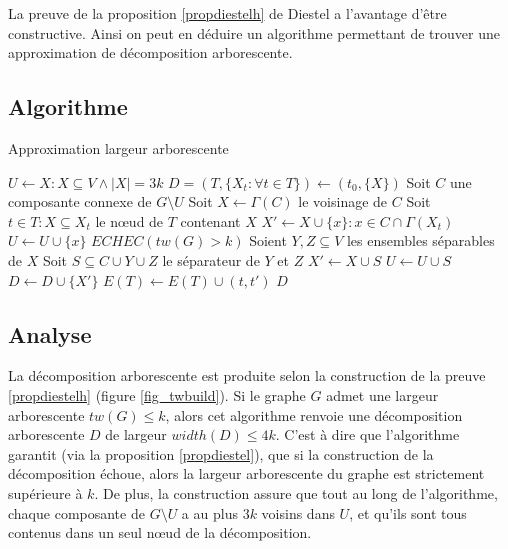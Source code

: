 
La preuve de la proposition \ref{propdiestelh} de Diestel a l'avantage d'être
constructive. Ainsi on peut en déduire un algorithme permettant de trouver
une approximation de décomposition arborescente.

\subsection{Algorithme}
\label{algo}
\begin{center}
\begin{algorithm}[H]
\caption{Approximation largeur arborescente}\label{algo_tw}
\begin{algorithmic}[1]
	\STATE $U \leftarrow X : X \subseteq V \wedge |X| = 3k$
	\STATE $D = (T,\{X_t : \forall t \in T\}) \leftarrow (t_0,\{X\})$
		\STATE Soit $C$ une composante connexe de $G \setminus U$
		\STATE Soit $X \leftarrow \Gamma(C)$ le voisinage de $C$
		\STATE Soit $t \in T : X \subseteq X_t$ le n\oe ud de $T$ contenant $X$
			\STATE $X' \leftarrow X \cup \{x\} : x \in C \cap \Gamma(X_t)$
			\STATE $U \leftarrow U \cup \{x\}$
		\ELSE
				\RETURN $ECHEC (tw(G) > k)$
			\ELSE
				\STATE Soient $Y,Z \subseteq V$ les ensembles séparables
				de $X$
				\STATE Soit $S \subseteq C \cup Y \cup Z$ le séparateur de $Y$ et $Z$
				\STATE $X' \leftarrow X \cup S$
				\STATE $U \leftarrow U \cup S$
			\ENDIF
		\ENDIF
		\STATE $D \leftarrow D \cup \{X'\}$
		\STATE $E(T) \leftarrow E(T) \cup (t,t')$
	\ENDWHILE
	\RETURN $D$
\end{algorithmic}
\end{algorithm}
\end{center}

\subsection{Analyse}
\label{analyse}
La décomposition arborescente est produite selon la construction
de la preuve \ref{propdiestelh} (figure \ref{fig_twbuild}).
Si le graphe $G$ admet une largeur arborescente $tw(G) \leq k$,
alors cet algorithme renvoie une décomposition arborescente $D$ de largeur $width(D) \leq 4k$.
C'est à dire que l'algorithme garantit (via la proposition \ref{propdiestel}), que
si la construction de la décomposition échoue, alors la largeur arborescente du graphe est
strictement supérieure à $k$.
De plus, la construction assure que tout au long de l'algorithme, chaque composante de $G \setminus U$
a au plus $3k$ voisins dans $U$, et qu'ils sont tous contenus dans un seul n\oe ud de la décomposition.

